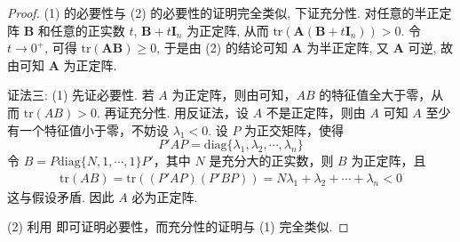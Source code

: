 \documentclass[../../main.tex]{subfiles}%
\begin{document}
\begin{proof}
(1) 的必要性与 (2) 的必要性的证明完全类似, 下证充分性. 对任意的半正定阵 \(\boldsymbol{B}\) 和任意的正实数 \(t\), \(\boldsymbol{B}+t\boldsymbol{I}_n\) 为正定阵, 从而 \(\mathrm{tr}(\boldsymbol{A}(\boldsymbol{B}+t\boldsymbol{I}_n))>0\). 令 \(t\to0^+\), 可得 \(\mathrm{tr}(\boldsymbol{A}\boldsymbol{B})\geqslant 0\), 于是由 (2) 的结论可知 \(\boldsymbol{A}\) 为半正定阵, 又 \(\boldsymbol{A}\) 可逆, 故由可知 \(\boldsymbol{A}\) 为正定阵.

{\color{blue}证法三:}
(1) 先证必要性. 若 \(A\) 为正定阵，则由可知，\(AB\) 的特征值全大于零，从而 \(\mathrm{tr}(AB)>0\). 再证充分性. 用反证法，设 \(A\) 不是正定阵，则由 \(A\) 可知 \(A\) 至少有一个特征值小于零，不妨设 \(\lambda_1 < 0\). 设 \(P\) 为正交矩阵，使得
\[
P'AP = \mathrm{diag}\{\lambda_1,\lambda_2,\cdots,\lambda_n\}
\]
令 \(B = P\mathrm{diag}\{N,1,\cdots,1\}P'\)，其中 \(N\) 是充分大的正实数，则 \(B\) 为正定阵，且
\begin{align*}
\mathrm{tr}(AB) = \mathrm{tr}\left((P'AP)(P'BP)\right) = N\lambda_1 + \lambda_2 + \cdots + \lambda_n < 0
\end{align*}
这与假设矛盾. 因此 \(A\) 必为正定阵.

(2) 利用 即可证明必要性，而充分性的证明与 (1) 完全类似. 
\end{proof}
\end{document}
